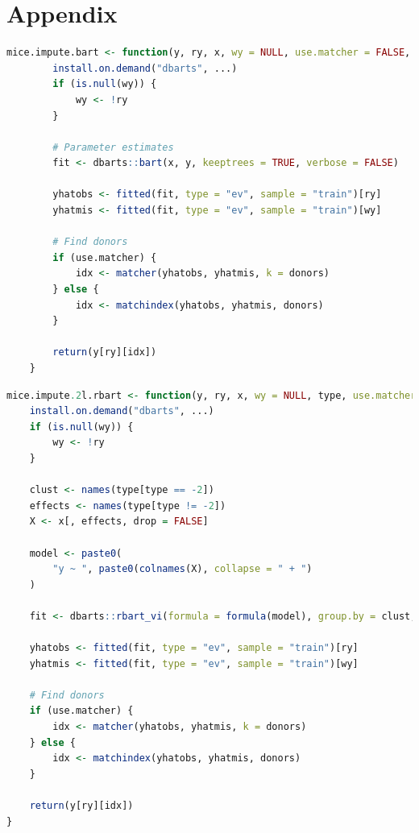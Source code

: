 \documentclass[10pt, a4paper, titlepage]{article}
\begin{document}
\section{Appendix}
\begin{lstlisting}[language=R, caption = {Imputation function for single-level BART}, label = {lst:singlelevelBART}]
    mice.impute.bart <- function(y, ry, x, wy = NULL, use.matcher = FALSE, donors = 5L, ...) {
        install.on.demand("dbarts", ...)
        if (is.null(wy)) {
            wy <- !ry
        }
    
        # Parameter estimates
        fit <- dbarts::bart(x, y, keeptrees = TRUE, verbose = FALSE)
    
        yhatobs <- fitted(fit, type = "ev", sample = "train")[ry]
        yhatmis <- fitted(fit, type = "ev", sample = "train")[wy]
    
        # Find donors
        if (use.matcher) {
            idx <- matcher(yhatobs, yhatmis, k = donors)
        } else {
            idx <- matchindex(yhatobs, yhatmis, donors)
        }
    
        return(y[ry][idx])
    }
\end{lstlisting}
\begin{lstlisting}[language=R, caption={Imputation function for random intercept BART}, label={lst:randominterceptBART}]
    mice.impute.2l.rbart <- function(y, ry, x, wy = NULL, type, use.matcher = FALSE, donors = 5L, ...) {
    install.on.demand("dbarts", ...)
    if (is.null(wy)) {
        wy <- !ry
    }

    clust <- names(type[type == -2])
    effects <- names(type[type != -2])
    X <- x[, effects, drop = FALSE]

    model <- paste0(
        "y ~ ", paste0(colnames(X), collapse = " + ")
    )

    fit <- dbarts::rbart_vi(formula = formula(model), group.by = clust, data = data.frame(y, x), verbose = FALSE, ...)

    yhatobs <- fitted(fit, type = "ev", sample = "train")[ry]
    yhatmis <- fitted(fit, type = "ev", sample = "train")[wy]

    # Find donors
    if (use.matcher) {
        idx <- matcher(yhatobs, yhatmis, k = donors)
    } else {
        idx <- matchindex(yhatobs, yhatmis, donors)
    }

    return(y[ry][idx])
}
\end{lstlisting}
\end{document}

